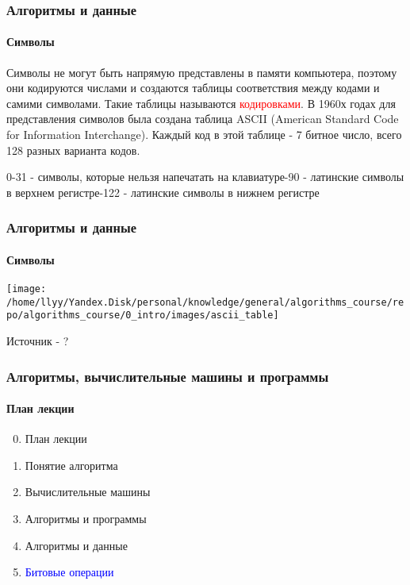 \documentclass[aspectratio=169]{beamer}
\begin{document}
\begin{frame}
\frametitle{Алгоритмы и данные}
\framesubtitle{Символы}
\justifying
\small
Символы не могут быть напрямую представлены в памяти компьютера, поэтому они кодируются числами и создаются таблицы соответствия между кодами и самими символами. Такие таблицы называются \textcolor{red}{кодировками}.\newline\newline
В 1960х годах для представления символов была создана таблица ASCII (American Standard Code for Information Interchange).\newline\newline
Каждый код в этой таблице - 7 битное число, всего 128 разных варианта кодов.\newline

0-31 - символы, которые нельзя напечатать на клавиатуре-90 - латинские символы в верхнем регистре-122 - латинские символы в нижнем регистре\newline
\end{frame}

\begin{frame}
\frametitle{Алгоритмы и данные}
\framesubtitle{Символы}
\justifying
\small
\centering
\texttt{[image: /home/llyy/Yandex.Disk/personal/knowledge/general/algorithms\_course/repo/algorithms\_course/0\_intro/images/ascii\_table]}

\tiny Источник - ?
\end{frame}

\begin{frame}
\frametitle{Алгоритмы, вычислительные машины и программы}
\framesubtitle{План лекции}

\begin{enumerate}
  \setcounter{enumi}{-1}
  \item{План лекции}
  \item{Понятие алгоритма}
  \item{Вычислительные машины}
  \item{Алгоритмы и программы}
  \item{Алгоритмы и данные}
  \item{\textcolor{blue}{Битовые операции}}

\end{enumerate}
\end{frame}
\end{document}
